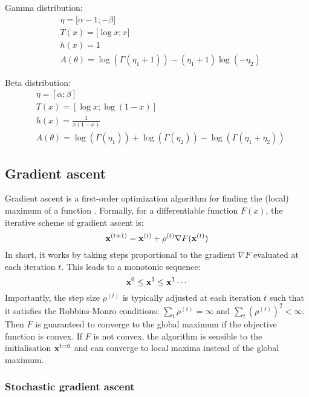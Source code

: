 Gamma distribution:
\begin{align*}
	& \eta = \lbrack \alpha - 1; -\beta \rbrack \\
	& T(x) = \lbrack \log x; x \rbrack \\
	& h(x) = 1 \\
	& A(\theta) = \log(\Gamma(\eta_1 + 1)) - (\eta_1 + 1) \log(-\eta_2)
\end{align*}

Beta distribution:
\begin{align*}
	& \eta = [\alpha; \beta] \\
	& T(x) = [\log x; \log (1-x)] \\
	& h(x) = \frac{1}{x(1-x)} \\
	& A(\theta) = \log(\Gamma(\eta_1)) +\log(\Gamma(\eta_2)) - \log(\Gamma(\eta_1+\eta_2))
\end{align*}


\subsection{Gradient ascent} \label{section:gradient_ascent}

Gradient ascent is a first-order optimization algorithm for finding the (local) maximum of a function \cite{Bishop2006,Murphy}. Formally, for a differentiable function $F(x)$, the iterative scheme of gradient ascent is:
\begin{equation} \label{gradient_ascent}
	{\bf x}^{(t+1)} = {\bf x}^{(t)} + \rho^{(t)} \nabla F({\bf x}^{(t)})
\end{equation}
In short, it works by taking steps proportional to the gradient $\nabla F$ evaluated at each iteration $t$. This leads to a monotonic sequence:
\[
	{\bf x}^{0} \leq {\bf x}^{1} \leq {\bf x}^{1} \cdots 
\]
Importantly, the step size $\rho^{(t)}$ is typically adjusted at each iteration $t$ such that it satisfies the Robbins-Monro conditions: $\sum_t \rho^{(t)} = \infty \text{ and } \sum_t (\rho^{(t)})^2 < \infty$. Then $F$ is guaranteed to converge to the global maximum \cite{Robbins-Monro1951} if the objective function is convex. If $F$ is not convex, the algorithm is sensible to the initialisation ${\bf x}^{t=0}$ and can converge to local maxima instead of the global maximum.


\subsubsection{Stochastic gradient ascent} \label{section:stochastic_gradient_ascent}


